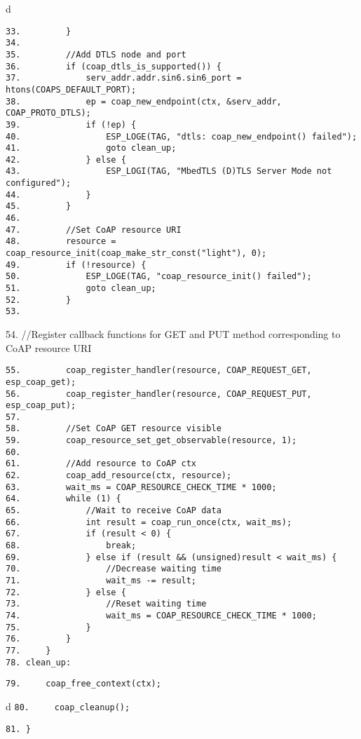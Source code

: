 \documentclass[a4paper,12pt]{book}
\begin{document}
\begin{codebloc}
\begin{tabular}{d}
\vspace{2pt}
\begin{verbatim}
33.         }
34.	
35.         //Add DTLS node and port
36.         if (coap_dtls_is_supported()) {
37.             serv_addr.addr.sin6.sin6_port = htons(COAPS_DEFAULT_PORT);
38.             ep = coap_new_endpoint(ctx, &serv_addr, COAP_PROTO_DTLS);
39.             if (!ep) {
40.                 ESP_LOGE(TAG, "dtls: coap_new_endpoint() failed");
41.                 goto clean_up;
42.             } else {
43.                 ESP_LOGI(TAG, "MbedTLS (D)TLS Server Mode not configured");
44.             }
45.         }
46.	
47.         //Set CoAP resource URI
48.         resource = coap_resource_init(coap_make_str_const("light"), 0);
49.         if (!resource) {
50.             ESP_LOGE(TAG, "coap_resource_init() failed");
51.             goto clean_up;
52.         }
53.	
\end{verbatim}
54. \fontsize{8.5pt}{10pt}\selectfont//Register callback functions for GET and PUT method corresponding to CoAP resource URI
\footnotesize
\begin{verbatim}
55.         coap_register_handler(resource, COAP_REQUEST_GET, esp_coap_get);
56.         coap_register_handler(resource, COAP_REQUEST_PUT, esp_coap_put);
57. 	 
58.         //Set CoAP GET resource visible
59.         coap_resource_set_get_observable(resource, 1);
60.	
61.         //Add resource to CoAP ctx
62.         coap_add_resource(ctx, resource);
63.         wait_ms = COAP_RESOURCE_CHECK_TIME * 1000;
64.         while (1) {
65.             //Wait to receive CoAP data
66.             int result = coap_run_once(ctx, wait_ms);
67.             if (result < 0) {
68.                 break;
69.             } else if (result && (unsigned)result < wait_ms) {
70.                 //Decrease waiting time
71.                 wait_ms -= result;
72.             } else {
73.                 //Reset waiting time
74.                 wait_ms = COAP_RESOURCE_CHECK_TIME * 1000;
75.             }
76.         }
77.     }
78.	clean_up:
\end{verbatim}
\verb|79.     coap_free_context(ctx);|
\end{tabular}
\end{codebloc}

\begin{codebloc}
\begin{tabular}{d}
\verb|80.     coap_cleanup();|

\verb|81. }|
\end{tabular}
\end{codebloc}
\end{document}
